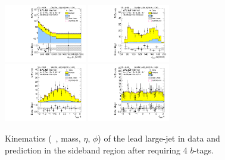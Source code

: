 \begin{figure}[htbp!]
\begin{center}
\includegraphics[width=0.32\textwidth,angle=-90]{figures/boosted/Sideband/b77_FourTag_Sideband_leadHCand_Pt_m_1.pdf}
\includegraphics[width=0.32\textwidth,angle=-90]{figures/boosted/Sideband/b77_FourTag_Sideband_leadHCand_Mass_s.pdf}\\
\includegraphics[width=0.32\textwidth,angle=-90]{figures/boosted/Sideband/b77_FourTag_Sideband_leadHCand_Eta.pdf}
\includegraphics[width=0.32\textwidth,angle=-90]{figures/boosted/Sideband/b77_FourTag_Sideband_leadHCand_Phi.pdf}
  \caption{Kinematics (\pt~, mass, $\eta$, $\phi$) of the lead large-\R jet in data and prediction in the sideband region after requiring 4 $b$-tags.}
  \label{fig:boosted-4b-sideband-ak10-lead}
\end{center}
\end{figure}

